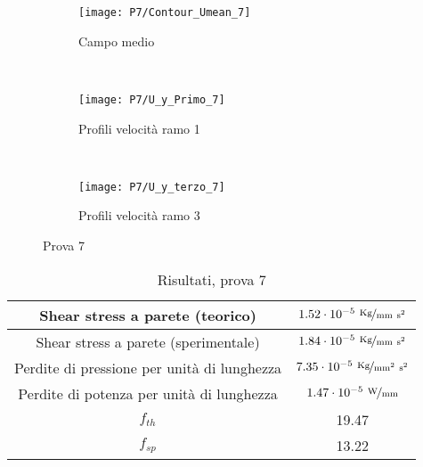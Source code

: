 \documentclass{article} %
\begin{document}
\begin{figure}[h]
	\centering
	\begin{subfigure}{0.3\textwidth}
		\texttt{[image: P7/Contour\_Umean\_7]}
		\caption{Campo medio}
		\label{fig:MEAN_U7}
	\end{subfigure} ~ 
	\begin{subfigure}{0.3\textwidth}
		\texttt{[image: P7/U\_y\_Primo\_7]}
		\caption{Profili velocità ramo 1}
		\label{fig:U1_y7}
	\end{subfigure} ~  
	\begin{subfigure}{0.3\textwidth}
		\texttt{[image: P7/U\_y\_terzo\_7]}
		\caption{Profili velocità ramo 3}
		\label{fig:U3_y7}	
	\end{subfigure}  
	\caption{Prova 7}
	\label{fig:7}
\end{figure}

\begin{table}[ht!]
	\centering
	\setlength \extrarowheight{3pt}
	\begin{tabular}{|c|c|}
		\hline
		Shear stress a parete (teorico) & $1.52 \cdot 10^{-5}\ \nicefrac{\rm Kg}{\rm mm\ s^2}$ \\ 
		\hline 
		Shear stress a parete (sperimentale) & $1.84 \cdot 10^{-5}\ \nicefrac{\rm Kg}{\rm mm\ s^2}$ \\ 
		\hline 
		Perdite di pressione per unità di lunghezza & $7.35 \cdot 10^{-5}\ \nicefrac{\rm Kg}{\rm mm^2\ s^2}$ \\ %
		\hline 
		Perdite di potenza per unità di lunghezza & $1.47 \cdot 10^{-5}\ \nicefrac{\rm W}{\rm mm}$ \\ 
		\hline 
		$f_{th}$ & 19.47 \\ 
		\hline 
		$f_{sp}$ & 13.22 \\ 
		\hline 
	\end{tabular}
	\caption{Risultati, prova 7}
	\label{tab:A7}
\end{table}

\end{document}
